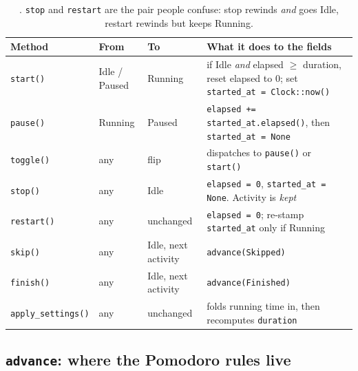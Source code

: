 \begin{table}[H]
\centering\small
\small\small\small\small\small\small\small\small\small\small\small\small\small\small\small\small\small\small\small\small\small\small\small\small\small\small\small\small\small\small\small\small\small\small\small\small\small\small\small\small\small\small\small\small\small\small\small\small\small\small\small\small\small\small\small\small\small\small\small\small\small\small\small\small\small\small\small\small\small\small\small\small\small\small\small\small\small\small\small\small\small\small\small\small\small\small\small\small\small\small\small\small\small\small\small\small\small\small\small\small\small\small\small\small\small\small\small\small\small\small\small\small\small\small\small\small\small\small\small\small\small\small\small\small\small\small\small\begin{tabular}{@{}p{20mm} p{18mm} p{20mm} p{70mm}@{}}
\toprule
\textbf{Method} & \textbf{From} & \textbf{To} & \textbf{What it does to the fields} \\
\midrule
\texttt{start()} & Idle / Paused & Running & if Idle \emph{and} elapsed $\ge$ duration, reset elapsed to 0; set \texttt{started\_at = Clock::now()} \\
\texttt{pause()} & Running & Paused & \texttt{elapsed += started\_at.elapsed()}, then \texttt{started\_at = None} \\
\texttt{toggle()} & any & flip & dispatches to \texttt{pause()} or \texttt{start()} \\
\texttt{stop()} & any & Idle & \texttt{elapsed = 0}, \texttt{started\_at = None}. Activity is \emph{kept} \\
\texttt{restart()} & any & unchanged & \texttt{elapsed = 0}; re-stamp \texttt{started\_at} only if Running \\
\texttt{skip()} & any & Idle, next activity & \texttt{advance(Skipped)} \\
\texttt{finish()} & any & Idle, next activity & \texttt{advance(Finished)} \\
\texttt{apply\_settings()} & any & unchanged & folds running time in, then recomputes \texttt{duration} \\
\bottomrule
\end{tabular}
\caption{. \texttt{stop} and \texttt{restart} are the pair people confuse:
stop rewinds \emph{and} goes Idle, restart rewinds but keeps Running.}
\end{table}

\subsection{\texttt{advance}: where the Pomodoro rules live}

